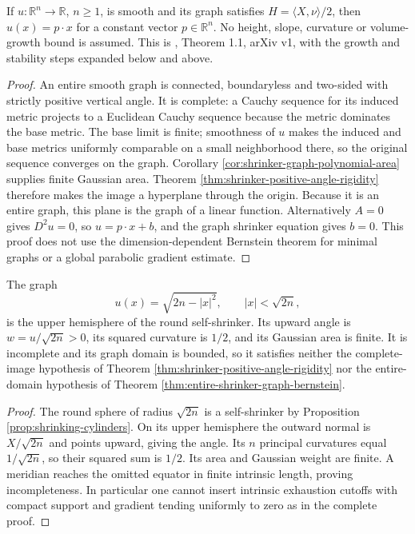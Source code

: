 \begin{theorem}\label{thm:entire-shrinker-graph-bernstein}
If $u:\mathbb R^n\to\mathbb R$, $n\geq1$, is smooth and its graph satisfies $H=\langle X,\nu\rangle/2$, then $u(x)=p\cdot x$ for a constant vector $p\in\mathbb R^n$. No height, slope, curvature or volume-growth bound is assumed. This is \cite{Wang09}, Theorem 1.1, arXiv v1, with the growth and stability steps expanded below and above.
\end{theorem}
\begin{proof}
An entire smooth graph is connected, boundaryless and two-sided with strictly positive vertical angle. It is complete: a Cauchy sequence for its induced metric projects to a Euclidean Cauchy sequence because the metric dominates the base metric. The base limit is finite; smoothness of $u$ makes the induced and base metrics uniformly comparable on a small neighborhood there, so the original sequence converges on the graph. Corollary \ref{cor:shrinker-graph-polynomial-area} supplies finite Gaussian area. Theorem \ref{thm:shrinker-positive-angle-rigidity} therefore makes the image a hyperplane through the origin. Because it is an entire graph, this plane is the graph of a linear function. Alternatively $A=0$ gives $D^2u=0$, so $u=p\cdot x+b$, and the graph shrinker equation gives $b=0$. This proof does not use the dimension-dependent Bernstein theorem for minimal graphs or a global parabolic gradient estimate.
\end{proof}

\begin{example}\label{ex:shrinker-hemisphere-incomplete}
The graph
\[
 u(x)=\sqrt{2n-|x|^2},\qquad |x|<\sqrt{2n},
\]
is the upper hemisphere of the round self-shrinker. Its upward angle is $w=u/\sqrt{2n}>0$, its squared curvature is $1/2$, and its Gaussian area is finite. It is incomplete and its graph domain is bounded, so it satisfies neither the complete-image hypothesis of Theorem \ref{thm:shrinker-positive-angle-rigidity} nor the entire-domain hypothesis of Theorem \ref{thm:entire-shrinker-graph-bernstein}.
\end{example}
\begin{proof}
The round sphere of radius $\sqrt{2n}$ is a self-shrinker by Proposition \ref{prop:shrinking-cylinders}. On its upper hemisphere the outward normal is $X/\sqrt{2n}$ and points upward, giving the angle. Its $n$ principal curvatures equal $1/\sqrt{2n}$, so their squared sum is $1/2$. Its area and Gaussian weight are finite. A meridian reaches the omitted equator in finite intrinsic length, proving incompleteness. In particular one cannot insert intrinsic exhaustion cutoffs with compact support and gradient tending uniformly to zero as in the complete proof.
\end{proof}
